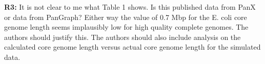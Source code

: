 \documentclass[aps,rmp,onecolumn]{revtex4-1}
\newcommand{\Marco}[1]{{\color{gray}Marco: #1}}
\newcommand{\Liam}[1]{{\color{teal}Liam: #1}}
\newcommand{\reviewer}[2]{\textbf{#1:} #2\vskip 5mm}
\begin{document}
\reviewer{R3}{It is not clear to me what Table 1 shows. Is this published data from PanX or data from PanGraph? Either way the value of 0.7 Mbp for the E. coli core genome length seems implausibly low for high quality complete genomes. The authors should justify this. The authors should also include analysis on the calculated core genome length versus actual core genome length for the simulated data.}
\end{document}
